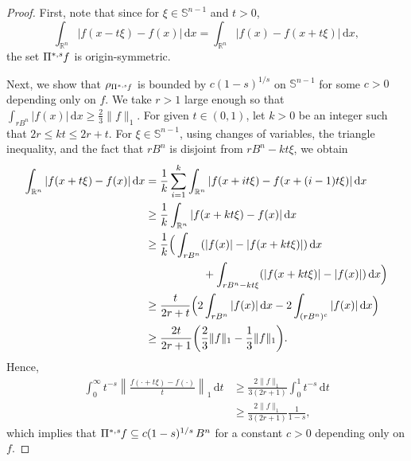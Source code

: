 \documentclass[10pt,a4paper]{amsart}
\newcommand{\Bvtex}{{B^n}}
\newcommand{\dvtex}{\,\mathrm{d}}
\newcommand{\ofpp}[1]{\operatorname{\Pi^{\ast,{\it #1}}}\!}
\newcommand{\snvtex}{{\mathbb S}^{n-1}}
\begin{document}
\begin{proof}
First, note that since for $\xi \in \snvtex $ and $t>0$,
%
\begin{equation*}
\int _{\mathbb R^{n}}\vert {f(x -t\xi )-f(x)}\vert \dvtex x=\int _{
\mathbb R^{n}}\vert f(x)-f(x+t\xi )\vert \dvtex x,
\end{equation*}
%
the set $\ofpp{s} f$ is origin-symmetric.

Next, we show that $\rho _{\ofpp{s} f}$ is bounded by
$c (1-s)^{1/s} $ on $\snvtex $ for some $c>0$ depending only on $f$. We take
$r>1$ large enough so that
$\int _{r \Bvtex} \vert f(x)\vert \dvtex x \geq \frac {2}{3} \|f\|_{1}$. For given
$t \in (0,1)$, let $k>0$ be an integer such that
$2r \leq k t \leq 2r+t$. For $\xi \in \snvtex $, using changes of variables,
the triangle inequality, and the fact that $r\Bvtex $ is disjoint from
$r\Bvtex -kt\xi $, we obtain
%
\begin{align*}
\int _{\mathbb R^{n}} |f(x+t\xi ) - f(x)| \dvtex x
&= \frac {1}{k} \sum _{i=1}^{k} \int _{\mathbb R^{n}} |f(x+ i t\xi ) -
f(x+ (i-1)t \xi )| \dvtex x
\\
&\geq \frac {1}{k} \int _{\mathbb R^{n}} |f(x+ k t\xi ) - f(x)| \dvtex x \\
&\geq \frac {1}{k} \Big( \int _{r \Bvtex} (|f(x)| - |f(x+kt\xi )|) \dvtex x
\\
&
\hskip 52pt
+ \int _{r \Bvtex -kt\xi}( |f(x+kt\xi )| - |f(x)|) \dvtex x \Big)
\\
&\geq \frac {t}{2r+t} \Big( 2 \int _{r \Bvtex} |f(x)| \dvtex x - 2\int _{(r
\Bvtex )^{c}} |f(x)| \dvtex x \Big)
\\
&\geq \frac {2t}{2r+1} \biggl( \frac {2}{3} \|f\|_{1} - \frac {1}{3} \|f\|_{1}
\biggr).
\end{align*}
%
Hence,
%
\begin{align}
\int _{0}^{\infty }t^{-s} \left \|\frac{f(\cdot +t\xi )-f(\cdot )}{t}
\right \|_{1} \dvtex t
&\geq \frac {2\|f\|_{1}}{3(2r+1)} \int _{0}^{1} t^{-s} \dvtex t
\nonumber \\
&\geq \frac {2\|f\|_{1}}{3(2r+1)} \frac {1}{1-s},
\nonumber
\end{align}
%
which implies that $\ofpp{s} f \subseteq c(1-s)^{1/s}\, \Bvtex $ for a constant
$c>0$ depending only on $f$.


\end{proof}
\end{document}
